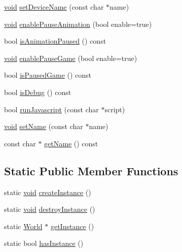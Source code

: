\begin{DoxyCompactItemize}
\mbox{\hyperlink{_thread_8h_af1e856da2e658414cb2456cb6f7ebc66}{void}} \mbox{\hyperlink{classnjli_1_1_world_a5c9cc63ac7cb847e6d581a867614e47d}{set\+Device\+Name}} (const char $\ast$name)
\item 
\mbox{\hyperlink{_thread_8h_af1e856da2e658414cb2456cb6f7ebc66}{void}} \mbox{\hyperlink{classnjli_1_1_world_a41b67b3dea3196afa6ff1b0d961b39d2}{enable\+Pause\+Animation}} (bool enable=true)
\item 
bool \mbox{\hyperlink{classnjli_1_1_world_ac84f5b1da4bbd124829f30b7a3fbd4d0}{is\+Animation\+Paused}} () const
\item 
\mbox{\hyperlink{_thread_8h_af1e856da2e658414cb2456cb6f7ebc66}{void}} \mbox{\hyperlink{classnjli_1_1_world_ae8f238cc0f23ce6b8a05ad5a3da555f7}{enable\+Pause\+Game}} (bool enable=true)
\item 
bool \mbox{\hyperlink{classnjli_1_1_world_abfbc1b055160d3c6a6ccd4f1ec784b0b}{is\+Paused\+Game}} () const
\item 
bool \mbox{\hyperlink{classnjli_1_1_world_a6470e58e64be02c4bf71a201417bcbbc}{is\+Debug}} () const
\item 
bool \mbox{\hyperlink{classnjli_1_1_world_a72aa272f2e66633642e069106f09c9e9}{run\+Javascript}} (const char $\ast$script)
\item 
\mbox{\hyperlink{_thread_8h_af1e856da2e658414cb2456cb6f7ebc66}{void}} \mbox{\hyperlink{classnjli_1_1_world_a087eb5f8d9f51cc476f12f1d10a3cb95}{set\+Name}} (const char $\ast$name)
\item 
const char $\ast$ \mbox{\hyperlink{classnjli_1_1_world_ad41266885be835f3ee602311e20877a4}{get\+Name}} () const
\end{DoxyCompactItemize}
\subsection*{Static Public Member Functions}
\begin{DoxyCompactItemize}
\item 
static \mbox{\hyperlink{_thread_8h_af1e856da2e658414cb2456cb6f7ebc66}{void}} \mbox{\hyperlink{classnjli_1_1_world_a7e31e4dff9169bd82c24e69ff29b53b6}{create\+Instance}} ()
\item 
static \mbox{\hyperlink{_thread_8h_af1e856da2e658414cb2456cb6f7ebc66}{void}} \mbox{\hyperlink{classnjli_1_1_world_a3bddccf6aeb57d953f358a2e66fc2c00}{destroy\+Instance}} ()
\item 
static \mbox{\hyperlink{classnjli_1_1_world}{World}} $\ast$ \mbox{\hyperlink{classnjli_1_1_world_a17a72893105bc732fdf5751a2a23b6d4}{get\+Instance}} ()
\item 
static bool \mbox{\hyperlink{classnjli_1_1_world_a9c8ccd2a51131b026b1ee6c9135eea8b}{has\+Instance}} ()
\end{DoxyCompactItemize}
